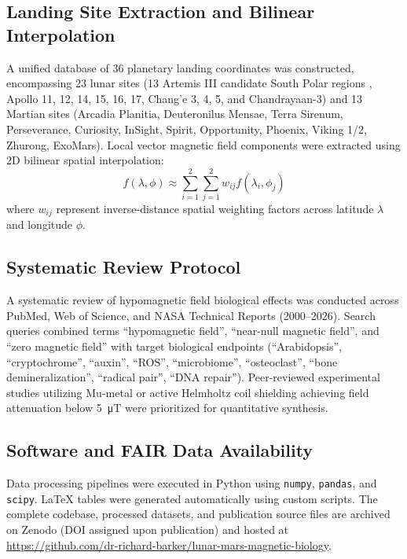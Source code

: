 \subsection{Landing Site Extraction and Bilinear Interpolation}
A unified database of 36 planetary landing coordinates was constructed, encompassing 23 lunar sites (13 Artemis III candidate South Polar regions \citep{NASA2022}, Apollo 11, 12, 14, 15, 16, 17, Chang'e 3, 4, 5, and Chandrayaan-3) and 13 Martian sites (Arcadia Planitia, Deuteronilus Mensae, Terra Sirenum, Perseverance, Curiosity, InSight, Spirit, Opportunity, Phoenix, Viking 1/2, Zhurong, ExoMars). Local vector magnetic field components were extracted using 2D bilinear spatial interpolation:
\begin{equation}
f(\lambda, \phi) \approx \sum_{i=1}^2 \sum_{j=1}^2 w_{ij} f(\lambda_i, \phi_j)
\end{equation}
where $w_{ij}$ represent inverse-distance spatial weighting factors across latitude $\lambda$ and longitude $\phi$.

\subsection{Systematic Review Protocol}
A systematic review of hypomagnetic field biological effects was conducted across PubMed, Web of Science, and NASA Technical Reports (2000--2026). Search queries combined terms ``hypomagnetic field'', ``near-null magnetic field'', and ``zero magnetic field'' with target biological endpoints (``Arabidopsis'', ``cryptochrome'', ``auxin'', ``ROS'', ``microbiome'', ``osteoclast'', ``bone demineralization'', ``radical pair'', ``DNA repair''). Peer-reviewed experimental studies utilizing Mu-metal or active Helmholtz coil shielding achieving field attenuation below \SI{5}{\micro\tesla} were prioritized for quantitative synthesis.

\subsection{Software and FAIR Data Availability}
Data processing pipelines were executed in Python using \texttt{numpy}, \texttt{pandas}, and \texttt{scipy}. LaTeX tables were generated automatically using custom scripts. The complete codebase, processed datasets, and publication source files are archived on Zenodo (DOI assigned upon publication) and hosted at \url{https://github.com/dr-richard-barker/lunar-mars-magnetic-biology}.
